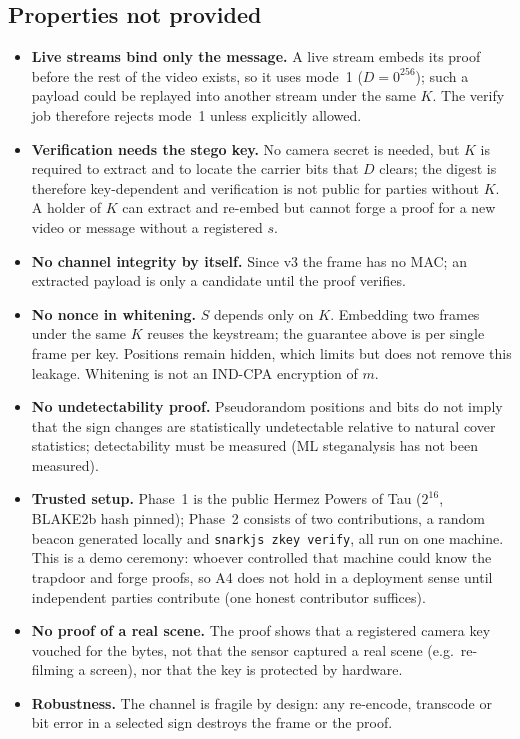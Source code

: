 \documentclass[11pt,a4paper]{article}
\theoremstyle{definition}
\theoremstyle{remark}
\begin{document}
\subsection*{Properties not provided}
\begin{itemize}
\item \textbf{Live streams bind only the message.} A live stream embeds its
proof before the rest of the video exists, so it uses mode~1 ($D=0^{256}$); such
a payload could be replayed into another stream under the same $K$. The verify
job therefore rejects mode~1 unless explicitly allowed.
\item \textbf{Verification needs the stego key.} No camera secret is needed, but
$K$ is required to extract and to locate the carrier bits that $D$ clears;
the digest is therefore key-dependent and verification is not public for
parties without $K$. A holder of $K$ can extract and re-embed but cannot forge
a proof for a new video or message without a registered $s$.
\item \textbf{No channel integrity by itself.} Since v3 the frame has no MAC; an
extracted payload is only a candidate until the proof verifies.
\item \textbf{No nonce in whitening.} $S$ depends only on $K$. Embedding two
frames under the same $K$ reuses the keystream; the guarantee above is per
single frame per key. Positions remain hidden, which limits but does not
remove this leakage. Whitening is not an IND-CPA encryption of $m$.
\item \textbf{No undetectability proof.} Pseudorandom positions and bits do not
imply that the sign changes are statistically undetectable relative to
natural cover statistics; detectability must be measured (ML steganalysis has
not been measured).
\item \textbf{Trusted setup.} Phase~1 is the public Hermez Powers of Tau
($2^{16}$, BLAKE2b hash pinned); Phase~2 consists of two contributions, a random
beacon generated locally and \texttt{snarkjs zkey verify}, all run on one
machine. This is a demo ceremony: whoever controlled that machine could know
the trapdoor and forge proofs, so A4 does not hold in a deployment sense until
independent parties contribute (one honest contributor suffices).
\item \textbf{No proof of a real scene.} The proof shows that a registered camera
key vouched for the bytes, not that the sensor captured a real scene (e.g.\
re-filming a screen), nor that the key is protected by hardware.
\item \textbf{Robustness.} The channel is fragile by design: any re-encode,
transcode or bit error in a selected sign destroys the frame or the proof.
\end{itemize}
\end{document}
